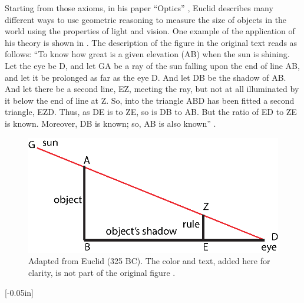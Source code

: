 Starting from those axioms, in his paper ``Optics'' \cite{Burton1945}, Euclid describes many different ways to use geometric reasoning to measure the size of objects in the world using the properties of light and vision.
One example of the application of his theory is shown in \fig{\ref{fig:euclid}}.
The description of the figure in the original text reads as follows:
``To know how great is a given elevation (AB) when the sun is shining. Let the eye be D, and let GA be a ray of the sun falling upon the end of line AB, and let it be prolonged as far as the eye D. And let DB be the shadow of AB. And let there be a second line, EZ, meeting the ray, but not at all illuminated by it below the end of line at Z. So, into the triangle ABD has been fitted a second triangle, EZD. Thus, as DE is to ZE, so is DB to AB. But the ratio of ED to ZE is known. Moreover, DB is known; so, AB is also known''
\cite{Burton1945}.


\begin{figure}[t]
    \centerline{
        \includegraphics[width=0.6\linewidth]{figures/taxonomy/euclid.eps}
    }
    \caption{Adapted from Euclid (325 BC). The color and text, added here for clarity, is not part of the original figure \cite{Burton1945}.
    }
    \label{fig:euclid}
\end{figure}


[-0.05in]


